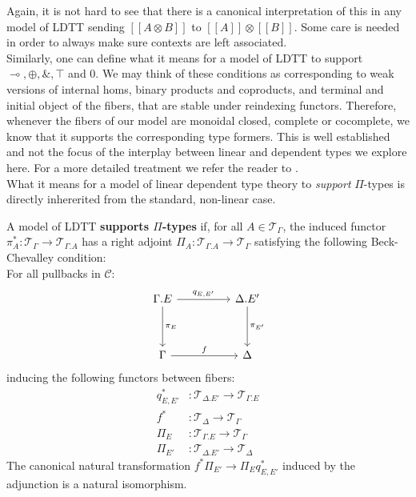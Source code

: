Again, it is not hard to see that there is a canonical interpretation of this in any model of LDTT sending $[[A \otimes B]]$ to $[[A]] \otimes [[B]]$. Some care is needed in order to always make sure contexts are left associated.\\
Similarly, one can define what it means for a model of LDTT to support $\multimap, \oplus, \&, \top$ and $0$. We may think of these conditions as corresponding to weak versions of internal homs, binary products and coproducts, and terminal and initial object of the fibers, that are stable under reindexing functors. Therefore, whenever the fibers of our model are monoidal closed, complete or cocomplete, we know that it supports the corresponding type formers. This is well established and not the focus of the interplay between linear and dependent types we explore here. For a more detailed treatment we refer the reader to \cite{mellies}.\\
What it means for a model of linear dependent type theory to \textit{support} $\Pi$-types is directly inhererited from the standard, non-linear case.
\begin{defn}A model of LDTT \textbf{supports $\Pi$-types} if, for all $A \in \mathcal{T}_{\Gamma}$, the induced functor $\pi_A^* : \mathcal{T}_{\Gamma} \to \mathcal{T}_{\Gamma.A}$ has a right adjoint $\Pi_A : \mathcal{T}_{\Gamma.A} \to \mathcal{T}_{\Gamma}$ satisfying the following Beck-Chevalley condition:\\
For all pullbacks in $\mathcal{C}$:
  \begin{equation}\label{pb-diag}
    \ti
    \Gamma.E \ar[d, "\pi_E"] \ar[r, "q_{E, E'}"] & \Delta.E' \ar[d, "\pi_{E'}"] \\
    \Gamma \ar[r, "f"] & \Delta
    \kz
  \end{equation}
inducing the following functors between fibers:
\[
  \begin{split}
    q^*_{E, E'} &: \mathcal{T}_{\Delta.E'} \to \mathcal{T}_{\Gamma.E}\\
    f^* &: \mathcal{T}_{\Delta} \to \mathcal{T}_{\Gamma}\\
    \Pi_E &: \mathcal{T}_{\Gamma.E} \to \mathcal{T}_{\Gamma}\\
    \Pi_{E'} &: \mathcal{T}_{\Delta.E'} \to \mathcal{T}_{\Delta}
  \end{split}    
\]
The canonical natural transformation $f^*\Pi_{E'} \to \Pi_{E}q^*_{E, E'}$ induced by the adjunction is a natural isomorphism.\\
\end{defn}
